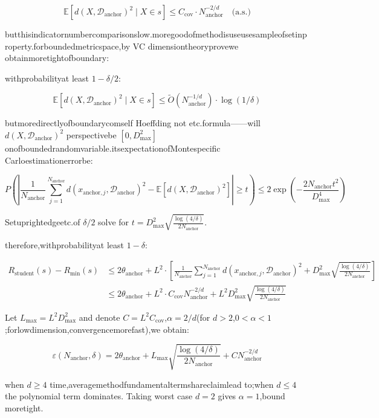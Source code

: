 \documentclass[
  12pt,
]{article}
\begin{document}
\[\mathbb{E}[d(X, \mathcal{D}_{\text{anchor}})^2 \mid X \in s] \le C_{\text{cov}} \cdot N_{\text{anchor}}^{-2/d} \quad \text{(a.s.)}\]

butthisindicatornumbercomparisonslow.moregoodofmethodisuseusesampleofsetinproperty.forboundedmetricspace,by VC
dimensiontheoryprovewe obtainmoretightofboundary:

withprobabilityat least \(1 - \delta/2\):

\[\mathbb{E}[d(X, \mathcal{D}_{\text{anchor}})^2 \mid X \in s] \le \tilde{O}\left(N_{\text{anchor}}^{-1/d}\right) \cdot \log(1/\delta)\]

butmoredirectlyofboundarycomself Hoeffding not etc.formula------will
\(d(X, \mathcal{D}_{\text{anchor}})^2\) perspectivebe \([0, D_{\max}^2]\)
onofboundedrandomvariable.itsexpectationofMontespecific Carloestimationerrorbe:

\[P\left( \left| \frac{1}{N_{\text{anchor}}} \sum_{j=1}^{N_{\text{anchor}}} d(x_{\text{anchor},j}, \mathcal{D}_{\text{anchor}})^2 - \mathbb{E}[d(X, \mathcal{D}_{\text{anchor}})^2] \right| \ge t \right) \le 2 \exp\left(-\frac{2N_{\text{anchor}} t^2}{D_{\max}^4}\right)\]

Setuprightedgeetc.of \(\delta/2\) solve for
\(t = D_{\max}^2 \sqrt{\frac{\log(4/\delta)}{2N_{\text{anchor}}}}\).

therefore,withprobabilityat least \(1 - \delta\):

\[\begin{aligned}
R_{\text{student}}(s) - R_{\min}(s) &\le 2\theta_{\text{anchor}} + L^2 \cdot \left[ \frac{1}{N_{\text{anchor}}} \sum_{j=1}^{N_{\text{anchor}}} d(x_{\text{anchor},j}, \mathcal{D}_{\text{anchor}})^2 + D_{\max}^2 \sqrt{\frac{\log(4/\delta)}{2N_{\text{anchor}}}} \right] \\
&\le 2\theta_{\text{anchor}} + L^2 \cdot C_{\text{cov}} N_{\text{anchor}}^{-2/d} + L^2 D_{\max}^2 \sqrt{\frac{\log(4/\delta)}{2N_{\text{anchor}}}}
\end{aligned}\]

Let \(L_{\max} = L^2 D_{\max}^2\) and denote
\(C = L^2 C_{\text{cov}}\),\(\alpha = 2/d\)(for
\(d > 2\),\(0 < \alpha < 1\);forlowdimension,convergencemorefast),we obtain:

\[\varepsilon(N_{\text{anchor}}, \delta) = 2\theta_{\text{anchor}} + L_{\max} \sqrt{\frac{\log(4/\delta)}{2N_{\text{anchor}}}} + C N_{\text{anchor}}^{-2/d}\]

when \(d \ge 4\) time,averagemethodfundamentaltermshareclaimlead to;when \(d \le 4\)
the polynomial term dominates. Taking worst case \(d = 2\) gives \(\alpha = 1\),bound
moretight.
\end{document}
